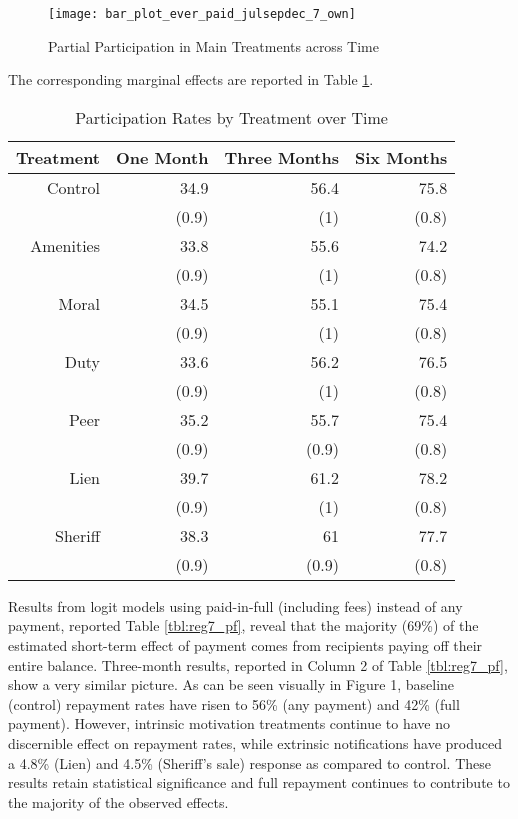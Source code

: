 \documentclass[12pt,titlepage]{article}
\begin{document}
\begin{figure}[htpb]
\begin{center}
\caption{Partial Participation in Main Treatments across Time}
\label{fig:ep_time_7_own}
\bigskip
\texttt{[image: bar\_plot\_ever\_paid\_julsepdec\_7\_own]}
\end{center}
\end{figure}


The corresponding marginal effects are reported in Table \ref{tbl:marg}.

\begin{table}[ht]
\centering
\caption{Participation Rates by Treatment over Time} 
\label{tbl:marg}
\begin{tabular}{rrrr}
  \hline
Treatment & One Month & Three Months & Six Months \\ 
  \hline
Control & 34.9 & 56.4 & 75.8 \\ 
   & (0.9) & (1) & (0.8) \\ 
  Amenities & 33.8 & 55.6 & 74.2 \\ 
   & (0.9) & (1) & (0.8) \\ 
  Moral & 34.5 & 55.1 & 75.4 \\ 
   & (0.9) & (1) & (0.8) \\ 
  Duty & 33.6 & 56.2 & 76.5 \\ 
   & (0.9) & (1) & (0.8) \\ 
  Peer & 35.2 & 55.7 & 75.4 \\ 
   & (0.9) & (0.9) & (0.8) \\ 
  Lien & 39.7 & 61.2 & 78.2 \\ 
   & (0.9) & (1) & (0.8) \\ 
  Sheriff & 38.3 & 61 & 77.7 \\ 
   & (0.9) & (0.9) & (0.8) \\ 
   \hline
\end{tabular}
\end{table}

Results from logit models using 
paid-in-full (including fees) instead of any payment, reported Table 
\ref{tbl:reg7_pf}, reveal that the majority (69\%) of the estimated 
short-term effect of payment comes from recipients paying off their entire balance.
Three-month results, reported in Column 2 of Table \ref{tbl:reg7_pf}, show a very 
similar picture. As can be seen visually in Figure 1, baseline (control) 
repayment rates have risen to 56\% (any payment) and 42\% (full payment). 
However, intrinsic motivation treatments continue to have no discernible 
effect on repayment rates, while extrinsic notifications have produced a 
4.8\% (Lien) and 4.5\% (Sheriff's sale) response as compared to control. These 
results retain statistical significance and full repayment continues to 
contribute to the majority of the observed effects.
\end{document}
